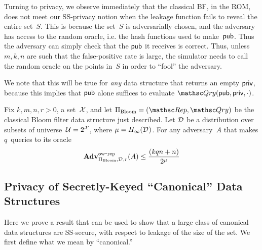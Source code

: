 Turning to privacy, we observe immediately that the classical BF, in the
ROM, does not meet our SS-privacy notion when the leakage function
fails to reveal the entire set~$S$.  This is because the set~$S$ is
adversarially chosen, and the adversary has access to the random
oracle, i.e. the hash functions used to make~${\sf pub}$.  Thus the
adversary can simply check that the ${\sf pub}$ it receives is correct.
Thus, unless $m,k,n$ are such that the false-positive rate is large,
the simulator needs to call the random oracle on the points in~$S$ in order to ``fool'' the adversary.

We note that this will be true for \emph{any} data structure that returns an empty ${\sf priv}$, because this implies that ${\sf pub}$ alone suffices to evaluate $\Qry(\pubaux,\privaux,\cdot)$.  

\begin{theorem}\label{thm3}\label{thm:bf-ow} 
Fix $k,m,n,r>0$, a set~${\cal X}$, and let $\setprim_{\mathrm{Bloom}}= (\Rep, \Qry)$ be the classical Bloom filter data structure just described. Let $\mathcal{D}_{}^{}$ be a distribution over subsets of universe~${\cal U}=2^{\cal X}$, where $\mu = H_\infty(\mathcal{D}_{}^{})$.  For any adversary~$A$ that makes $q$~queries to its oracle
\[
\mathrm{\mathbf{Adv}}^{\mathrm{ow\mbox{-}rep}}_{\Pi_{\mathrm{Bloom}},\mathcal{D}_{}^{},r}(A) \leq  \frac{(kqn+n)}{2^{\mu}}
\]
\end{theorem}

\subsection{Privacy of Secretly-Keyed ``Canonical'' Data Structures}
Here we prove a result that can be used to show that a large class of canonical
data structures are SS-secure, with respect to leakage of the size of the set.
We first define what we mean by ``canonical.''


